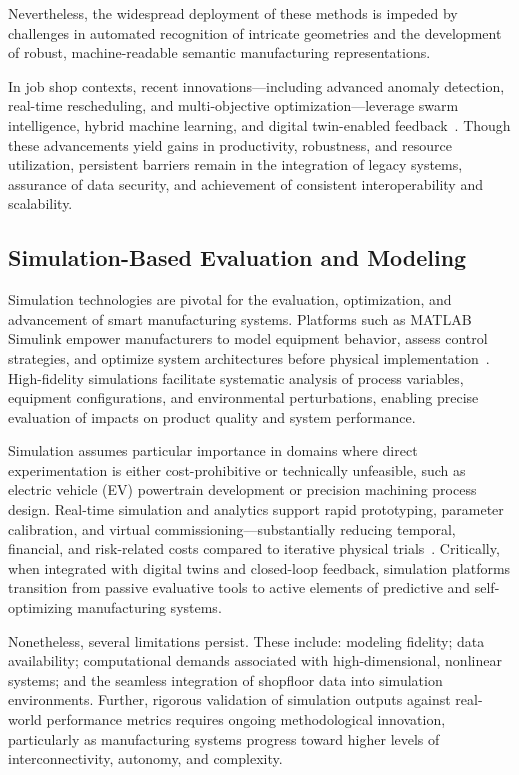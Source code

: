 Nevertheless, the widespread deployment of these methods is impeded by challenges in automated recognition of intricate geometries and the development of robust, machine-readable semantic manufacturing representations.

In job shop contexts, recent innovations—including advanced anomaly detection, real-time rescheduling, and multi-objective optimization—leverage swarm intelligence, hybrid machine learning, and digital twin-enabled feedback~\cite{ref19,ref27,ref38,ref44}. Though these advancements yield gains in productivity, robustness, and resource utilization, persistent barriers remain in the integration of legacy systems, assurance of data security, and achievement of consistent interoperability and scalability.

\subsection{Simulation-Based Evaluation and Modeling}

Simulation technologies are pivotal for the evaluation, optimization, and advancement of smart manufacturing systems. Platforms such as MATLAB Simulink empower manufacturers to model equipment behavior, assess control strategies, and optimize system architectures before physical implementation~\cite{ref95}. High-fidelity simulations facilitate systematic analysis of process variables, equipment configurations, and environmental perturbations, enabling precise evaluation of impacts on product quality and system performance.

Simulation assumes particular importance in domains where direct experimentation is either cost-prohibitive or technically unfeasible, such as electric vehicle (EV) powertrain development or precision machining process design. Real-time simulation and analytics support rapid prototyping, parameter calibration, and virtual commissioning—substantially reducing temporal, financial, and risk-related costs compared to iterative physical trials~\cite{ref95}. Critically, when integrated with digital twins and closed-loop feedback, simulation platforms transition from passive evaluative tools to active elements of predictive and self-optimizing manufacturing systems.

Nonetheless, several limitations persist. These include: modeling fidelity; data availability; computational demands associated with high-dimensional, nonlinear systems; and the seamless integration of shopfloor data into simulation environments. Further, rigorous validation of simulation outputs against real-world performance metrics requires ongoing methodological innovation, particularly as manufacturing systems progress toward higher levels of interconnectivity, autonomy, and complexity.


